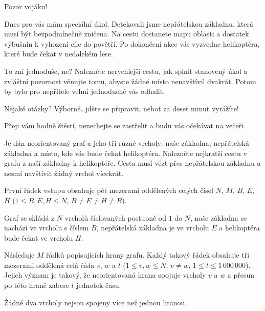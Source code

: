 





\noindent
Pozor vojáku!

\bigskip \noindent
Dnes pro vás mám speciální úkol. Detekovali jsme nepřátelskou základnu,
která musí být bezpodmínečně zničena. Na cestu dostanete mapu oblasti a dostatek
výbušnin k vyhození cíle do povětří. Po dokončení akce vás vyzvedne helikoptéra,
které bude čekat v nedalekém lese.

\bigskip \noindent
To zní jednoduše, ne? Nalezněte nerychlejší cestu, jak splnit stanovený úkol a
zvláštní pozornost věnujte tomu, abyste žádné místo nenavštívil dvakrát.
Potom by bylo pro nepřítele velmi jednoduché vás odhalit.

\bigskip \noindent
Nějaké otázky? Výborně\dots jděte se připravit, neboť za deset minut vyrážíte!

\bigskip \noindent
Přeji vám hodně štěstí, nenechejte se zastřelit a budu vás očekávat na večeři.


Je dán neorientovaný graf a jeho tři různé vrcholy: naše základna, nepřátelská
základna a místo, kde vás bude čekat helikoptéra. Nalezněte nejkratší cestu
v grafu z naší základny k helikoptéře. Cesta musí vézt přes nepřátelskou základnu
a nesmí navštívit žádný vrchol vícekrát.


První řádek vstupu obsahuje pět mezerami oddělených celých čísel $N$, $M$, $B$, $E$, $H$
($1 \le B, E, H \le N$, $B \neq E \neq H \neq B$).

Graf se skládá z $N$ vrcholů číslovaných postupně od $1$ do $N$,
naše základna se nachází ve vrcholu s číslem $B$,
nepřátelská základna je ve vrcholu $E$ a
helikoptéra bude čekat ve vrcholu $H$.

Následuje $M$ řádků popisujících hrany grafu.
Každý takový řádek obsahuje tři mezerami oddělená celá čísla
$v$, $w$ a $t$ ($1 \le v, w \le N$, $v \neq w$, $1 \le t \le 1\,000\,000$).
Jejich význam je takový, že neorientovaná hrana spojuje vrcholy $v$ a $w$
a přesun po této hraně zabere $t$ jednotek času.

Žádné dva vrcholy nejsou spojeny více než jednou hranou.

